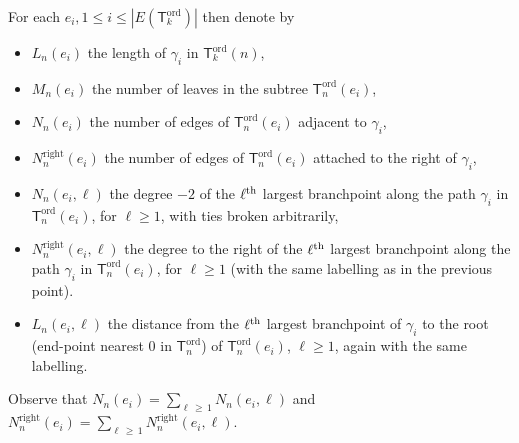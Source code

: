 \documentclass[10pt]{amsart}
\theoremstyle{definition}\newtheorem{defi}[theo]{Definition}\newtheorem{rema}[theo]{Remark}\newtheorem{exam}[theo]{Example}\newtheorem{exem}[theo]{Example}\newtheorem{nota}[theo]{Notation}
\newcommand{\ord}{\mathrm{ord}}
\newcommand{\Rightll}{\mathrm{right}}
\newcommand{\sT}{\mathsf{T}}
\begin{document}
For each $e_i, 1 \le i \le |E(\sT_k^{\ord})|$ then denote by
\begin{itemize}
\item $L_{n}(e_i)$ the length of $\gamma_i$ in $\sT^{\ord}_{k}(n)$,
\item $M_{n}(e_i)$ the number of leaves in the subtree $\sT_n^{\ord}(e_i)$,
\item $N_{n}(e_i)$ the number of edges of $\sT^{\ord}_n(e_i)$ adjacent to $\gamma_i$,
\item $N^{\Rightll}_{n}(e_i)$ the number of edges of $\sT^{\ord}_n(e_i)$ attached to the right of $\gamma_i$,
\item $N_n(e_i, \ell)$ the degree $-2$ of the $\ell^{\rm th}$ largest branchpoint along the path $\gamma_i$ in $\sT^{\ord}_n(e_i)$, for $\ell \ge 1$, with ties broken arbitrarily,
\item $N^{\Rightll}_n(e_i, \ell)$ the degree to the right of the $\ell^{\rm th}$ largest branchpoint along the path $\gamma_i$ in $\sT^{\ord}_n(e_i)$, for $\ell \ge 1$ (with the same labelling as in the previous point).
\item $L_n(e_i,\ell)$ the distance from the $\ell^{\rm th}$ largest branchpoint of $\gamma_i$ to the root (end-point nearest 0 in $\sT^{\ord}_n$) of $\sT^{\ord}_n(e_i)$, $\ell\geq 1$, again with the same labelling.
\end{itemize}
Observe that $N_n(e_i) = \sum_{\ell\,\ge\,1} N_n(e_i, \ell)$ and $N^{\Rightll}_{n}(e_i) = \sum_{\ell\,\ge\, 1} N^{\Rightll}_n(e_i, \ell)$.
\end{document}
